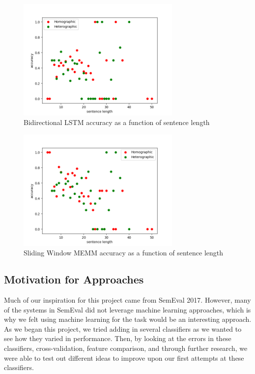 \documentclass{article}
\begin{document}
\begin{figure}[h!]
    \centering
    \includegraphics[width=8cm]{figures/location-rnn.png}
	\caption{Bidirectional LSTM accuracy as a function of sentence length}
    \label{fig:method}
\end{figure}

\begin{figure}[h!]
    \centering
    \includegraphics[width=8cm]{figures/location-window.png}
	\caption{Sliding Window MEMM accuracy as a function of sentence length}
    \label{fig:method}
\end{figure}


\subsection{Motivation for Approaches}
Much of our inspiration for this project came from SemEval 2017. However, many of the systems in SemEval did not leverage machine learning approaches, which is why we felt using machine learning for the task would be an interesting approach. As we began this project, we tried adding in several classifiers as we wanted to see how they varied in performance. Then, by looking at the errors in these classifiers, cross-validation, feature comparison, and through further research, we were able to test out different ideas to  improve upon our first attempts at these classifiers. 
\end{document}
